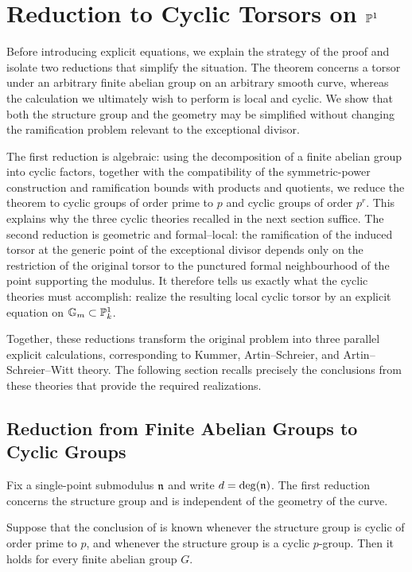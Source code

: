 \section{Reduction to Cyclic Torsors on \texorpdfstring{$\mathbb{P}^1$}{P1}}
\label{section:reductions_before_cyclic_theories}

Before introducing explicit equations, we explain the strategy of the proof
and isolate two reductions that simplify the situation. The theorem concerns
a torsor under an arbitrary finite abelian group on an arbitrary smooth curve,
whereas the calculation we ultimately wish to perform is local and cyclic. We
show that both the structure group and the geometry may be simplified without
changing the ramification problem relevant to the exceptional divisor.

The first reduction is algebraic: using the decomposition of a finite abelian
group into cyclic factors, together with the compatibility of the
symmetric-power construction and ramification bounds with products and
quotients, we reduce the theorem to cyclic groups of order prime to $p$ and
cyclic groups of order $p^r$. This explains why the three cyclic theories
recalled in the next section suffice. The second reduction is geometric and
formal--local: the ramification of the induced torsor at the generic point of
the exceptional divisor depends only on the restriction of the original
torsor to the punctured formal neighbourhood of the point supporting the
modulus. It therefore tells us exactly what the cyclic theories must
accomplish: realize the resulting local cyclic torsor by an explicit equation
on $\mathbb{G}_m \subset \mathbb{P}^1_k$.

Together, these reductions transform the original problem into three parallel
explicit calculations, corresponding to Kummer, Artin--Schreier, and
Artin--Schreier--Witt theory. The following section recalls precisely the
conclusions from these theories that provide the required realizations.

\subsection{Reduction from Finite Abelian Groups to Cyclic Groups}

Fix a single-point submodulus $\mathfrak{n}$ and write $d=\deg(\mathfrak{n})$. The first
reduction concerns the structure group and is independent of the geometry of
the curve.

\begin{prop}
\label{prop:reduction_to_cyclic_groups}
Suppose that the conclusion of
 is known whenever the structure
group is cyclic of order prime to $p$, and whenever the structure group is a
cyclic $p$-group. Then it holds for every finite abelian group $G$.
\end{prop}

